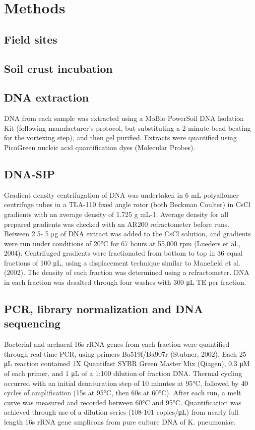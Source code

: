 \section{Methods}
\subsection{Field sites}
\subsection{Soil crust incubation}
\subsection{DNA extraction}
DNA from each sample was extracted using a MoBio PowerSoil DNA Isolation Kit (following manufacturer’s protocol, but substituting a 2 minute bead beating for the vortexing step), and then gel purified. Extracts were quantified using PicoGreen nucleic acid quantification dyes (Molecular Probes). 
\subsection{DNA-SIP}
 Gradient density centrifugation of DNA was undertaken in 6 mL polyallomer centrifuge tubes in a TLA-110 fixed angle rotor (both Beckman Coulter) in CsCl gradients with an average density of 1.725 g mL-1.  Average density for all prepared gradients was checked with an AR200 refractometer before runs. Between 2.5- 5 μg of DNA extract was added to the CsCl solution, and gradients were run under conditions of 20°C for 67 hours at 55,000 rpm (Lueders et al., 2004). Centrifuged gradients were fractionated from bottom to top in 36 equal fractions of 100 μL, using a displacement technique similar to Manefield et al. (2002). The density of each fraction was determined using a refractometer. DNA in each fraction was desalted through four washes with 300 μL TE per fraction. 
\subsection{PCR, library normalization and DNA sequencing}
Bacterial and archaeal 16s rRNA genes from each fraction were quantified through real-time PCR, using primers Ba519f/Ba907r (Stubner, 2002).  Each 25 μL reaction contained 1X Quantifast SYBR Green Master Mix (Qiagen), 0.3 μM of each primer, and 1 μL of a 1:100 dilution of fraction DNA. Thermal cycling occurred with an initial denaturation step of 10 minutes at 95°C, followed by 40 cycles of amplification (15s at 95°C, then 60s at 60°C). After each run, a melt curve was measured and recorded between 60°C and 95°C. Quantification was achieved through use of a dilution series (108-101 copies/μL) from nearly full length 16s rRNA gene amplicons from pure culture DNA of K. pneumoniae. 


